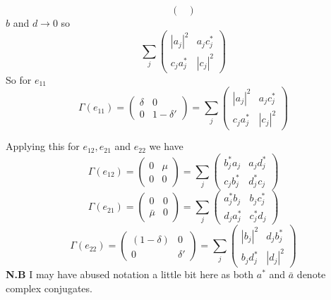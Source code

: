\documentclass[12pt]{article}
\begin{document}
\begin{enumerate}
\begin{enumerate}
$$\begin{pmatrix}
                        \end{pmatrix} $$
        $b$ and $d \rightarrow 0$ so 
        $$ \sum_j \begin{pmatrix}
          |a_j|^2&a_j c_j^*\\ c_j a_j^*& |c_j|^2 
            \end{pmatrix} $$
        So for $e_{11}$ 
        $$ \Gamma(e_{11}) = \begin{pmatrix}
            \delta&0\\0 &1-\delta'
            \end{pmatrix} = \sum_j \begin{pmatrix}
                |a_j|^2&a_j c_j^*\\ c_j a_j^*& |c_j|^2 
                  \end{pmatrix} $$ 

        Applying this for $e_{12}, e_{21}$ and $e_{22}$ we have 
        $$ \Gamma(e_{12}) = \begin{pmatrix}
            0&\mu\\0 &0
            \end{pmatrix} = \sum_j \begin{pmatrix}
                b_j^* a_j&a_j d_j^*\\ c_j b_j^*& d_j^* c_j 
                  \end{pmatrix} $$ 
         $$ \Gamma(e_{21}) = \begin{pmatrix}
            0&0\\\bar{\mu} &0
            \end{pmatrix} = \sum_j \begin{pmatrix}
                a_j^* b_j&b_j c_j^*\\ d_j a_j^*& c_j^* d_j 
                  \end{pmatrix} $$ 
     $$ \Gamma(e_{22}) = \begin{pmatrix}
            (1-\delta)&0\\0 &\delta'
            \end{pmatrix} = \sum_j \begin{pmatrix}
                |b_j|^2&d_j b_j^*\\ b_j d_j^*& |d_j|^2 
                  \end{pmatrix} $$ 
    \textbf{N.B} I may have abused notation a little bit here as both $a^*$ and $\bar{a}$ denote complex conjugates.


\end{enumerate}
\end{enumerate}
\end{document}
